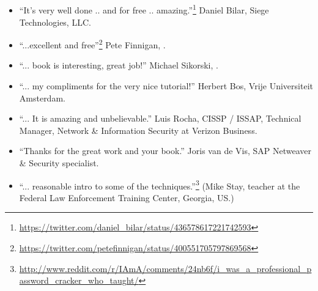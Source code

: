 ﻿\subsection*{ \IT{\TITLE}}

\begin{itemize}
\item ``It's very well done .. and for free .. amazing.''\footnote{\url{https://twitter.com/daniel_bilar/status/436578617221742593}} Daniel Bilar, Siege Technologies, LLC.

\item ``...excellent and free''\footnote{\url{https://twitter.com/petefinnigan/status/400551705797869568}} Pete Finnigan, \oracle{}.

\item ``... book is interesting, great job!'' Michael Sikorski,  .

\item ``... my compliments for the very nice tutorial!'' Herbert Bos,  Vrije Universiteit Amsterdam.

\item ``... It is amazing and unbelievable.'' Luis Rocha, CISSP / ISSAP, Technical Manager, Network \& Information Security at Verizon Business.

\item ``Thanks for the great work and your book.'' Joris van de Vis, SAP Netweaver \& Security specialist.

\item ``... reasonable intro to some of the techniques.''\footnote{\url{http://www.reddit.com/r/IAmA/comments/24nb6f/i_was_a_professional_password_cracker_who_taught/}} (Mike Stay, teacher at the Federal Law Enforcement Training Center, Georgia, US.)

\end{itemize}
